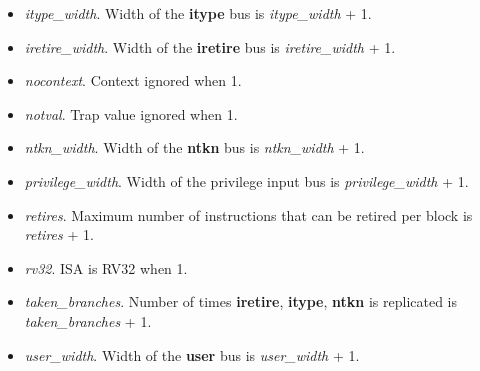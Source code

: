 \begin{itemize}
    \item \textit{itype\_width}. Width of the \textbf{itype} bus is \textit{itype\_width} + 1.
    \item \textit{iretire\_width}. Width of the \textbf{iretire} bus is \textit{iretire\_width} + 1.
    \item \textit{nocontext}. Context ignored when 1.
    \item \textit{notval}. Trap value ignored when 1.
    \item \textit{ntkn\_width}. Width of the \textbf{ntkn} bus is \textit{ntkn\_width} + 1.
    \item \textit{privilege\_width}. Width of the privilege input bus is \textit{privilege\_width} + 1.
    \item \textit{retires}. Maximum number of instructions that can be retired per block is \textit{retires} + 1.
    \item \textit{rv32}. ISA is RV32 when 1.
    \item \textit{taken\_branches}. Number of times \textbf{iretire}, \textbf{itype}, \textbf{ntkn} is replicated is \textit{taken\_branches} + 1.
    \item \textit{user\_width}. Width of the \textbf{user} bus is \textit{user\_width} + 1.
\end{itemize}
